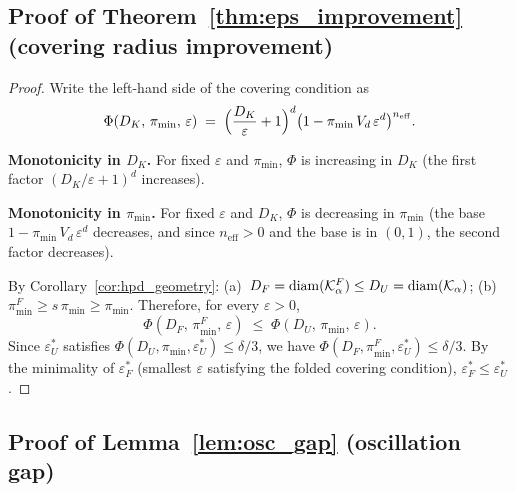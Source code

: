 \subsection{Proof of Theorem~\ref{thm:eps_improvement}
  (covering radius improvement)}
\label{app:proof_eps}

\begin{proof}
  Write the left-hand side of the covering condition as
  \[
    \Phi(D_K,\, \pi_{\min},\, \varepsilon)
    \;=\;
    \Bigl(\frac{D_K}{\varepsilon} + 1\Bigr)^d
    \bigl(1 - \pi_{\min}\,V_d\,\varepsilon^d\bigr)^{n_{\mathrm{eff}}}.
  \]

  \textbf{Monotonicity in $D_K$.}
  For fixed $\varepsilon$ and $\pi_{\min}$,
  $\Phi$ is increasing in $D_K$
  (the first factor $(D_K/\varepsilon + 1)^d$ increases).

  \textbf{Monotonicity in $\pi_{\min}$.}
  For fixed $\varepsilon$ and $D_K$,
  $\Phi$ is decreasing in $\pi_{\min}$
  (the base $1 - \pi_{\min}\,V_d\,\varepsilon^d$ decreases,
  and since $n_{\mathrm{eff}} > 0$ and the base is in $(0,1)$,
  the second factor decreases).

  By Corollary~\ref{cor:hpd_geometry}:
  (a)~$D_F = \mathrm{diam}(\mathcal{K}_\alpha^F) \leq D_U = \mathrm{diam}(\mathcal{K}_\alpha)$;
  (b)~$\pi_{\min}^F \geq s\,\pi_{\min} \geq \pi_{\min}$.
  Therefore, for every $\varepsilon > 0$,
  \[
    \Phi(D_F,\, \pi_{\min}^F,\, \varepsilon)
    \;\leq\;
    \Phi(D_U,\, \pi_{\min},\, \varepsilon).
  \]
  Since $\varepsilon_U^*$ satisfies
  $\Phi(D_U, \pi_{\min}, \varepsilon_U^*) \leq \delta/3$,
  we have
  $\Phi(D_F, \pi_{\min}^F, \varepsilon_U^*) \leq \delta/3$.
  By the minimality of $\varepsilon_F^*$ (smallest $\varepsilon$
  satisfying the folded covering condition),
  $\varepsilon_F^* \leq \varepsilon_U^*$.
\end{proof}


\subsection{Proof of Lemma~\ref{lem:osc_gap} (oscillation gap)}
\label{app:proof_osc_gap}

